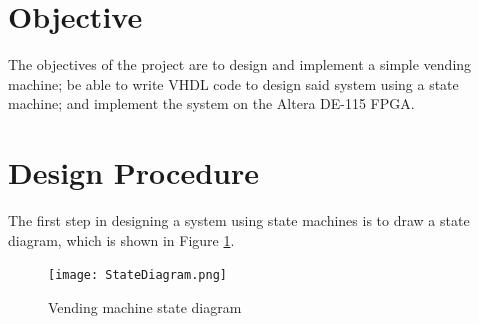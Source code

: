 \documentclass[12pt]{article}
\begin{document}

\newpage

\section{Objective} \label{sec:obj}
The objectives of the project are to design and implement a simple vending machine; be able to write VHDL code to design said system using a state machine; and implement the system on the Altera DE-115 FPGA.

\section{Design Procedure} \label{sec:desproc}
The first step in designing a system using state machines is to draw a state diagram, which is shown in Figure \ref{fig:toplevel}.

\begin{figure}[!h]
\setlength{\belowcaptionskip}{-10pt}
\begin{center}
\texttt{[image: StateDiagram.png]}
\caption{Vending machine state diagram}
\label{fig:toplevel}
\end{center}
\end{figure}
\end{document}
